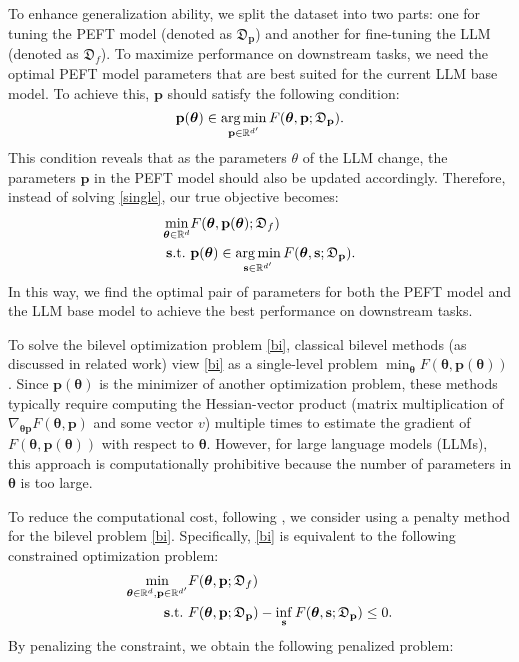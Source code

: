 To enhance generalization ability, we split the dataset into two parts: one for tuning the PEFT model (denoted as $\mathfrak{D}_{ \mathbf{p}}$) and another for fine-tuning the LLM (denoted as $\mathfrak{D}_f$). To maximize performance on downstream tasks, we need the optimal PEFT model parameters that are best suited for the current LLM base model. To achieve this, ${ \mathbf{p}}$ should satisfy the following condition:
 \[
{ \mathbf{p}(\bm{\theta})} \in \mathop{\rm arg\,min}_{{ \mathbf{p}}\in \mathbb{R}^{d'}} F({ \bm{\theta}}, { \mathbf{p}};\mathfrak{D}_{ \mathbf{p}}).
\]
This condition reveals that as the parameters $\theta$ of the LLM change, the parameters ${ \mathbf{p}}$ in the PEFT model should also be updated accordingly. Therefore, instead of solving \eqref{single}, our true objective becomes:
\begin{equation}\label{bi}
\begin{split}
\min_{{ \bm{\theta}}\in \mathbb{R}^d} &F({ \bm{\theta}}, { \mathbf{p}(\bm{\theta})};\mathfrak{D}_f)\\
{\rm { \mathbf{s}}.t.\ }& { \mathbf{p}(\bm{\theta})} \in \mathop{\rm arg\,min}_{{ \mathbf{s}}\in \mathbb{R}^{d'}} F({ \bm{\theta}}, { \mathbf{{ \mathbf{s}}}};\mathfrak{D}_{ \mathbf{p}}).
\end{split}
\end{equation}
In this way, we find the optimal pair of parameters for both the PEFT model and the LLM base model to achieve the best performance on downstream tasks.

To solve the bilevel optimization problem \eqref{bi}, classical bilevel methods (as discussed in related work) view \eqref{bi} as a single-level problem $\min_{ \bm{\theta}} F({ \bm{\theta}}, { \mathbf{p}(\bm{\theta})})$. Since ${ \mathbf{p}(\bm{\theta})}$ is the minimizer of another optimization problem, these methods typically require computing the Hessian-vector product (matrix multiplication of $\nabla_{{ \bm{\theta}} { \mathbf{p}}} F({ \bm{\theta}}, { \mathbf{p}})$ and some vector $v$) multiple times to estimate the gradient of $F({ \bm{\theta}}, { \mathbf{p}(\mathbf{{ \bm{\theta}}})})$ with respect to ${ \bm{\theta}}$. However, for large language models (LLMs), this approach is computationally prohibitive because the number of parameters in ${ \bm{\theta}}$ is too large.

To reduce the computational cost, following \citet{LuMei24}, we consider using a penalty method for the bilevel problem \eqref{bi}. Specifically, \eqref{bi} is equivalent to the following constrained optimization problem:
\begin{equation}\label{bi_constraint}
\begin{split}
\min_{\bm{\theta} \in \mathbb{R}^d , \bm{\mathbf{p}} \in \mathbb{R}^{d'}} &F({ \bm{\theta}}, { \mathbf{p}};\mathfrak{D}_f)\\
{\rm { \mathbf{s}}.t.\ }& F({ \bm{\theta}}, { \mathbf{p}};\mathfrak{D}_{ \mathbf{p}}) - \inf_{ \mathbf{{ \mathbf{s}}}}F({ \bm{\theta}}, { \mathbf{{ \mathbf{s}}}};\mathfrak{D}_{ \mathbf{p}})\le 0.
\end{split}
\end{equation}
By penalizing the constraint, we obtain the following penalized problem:

